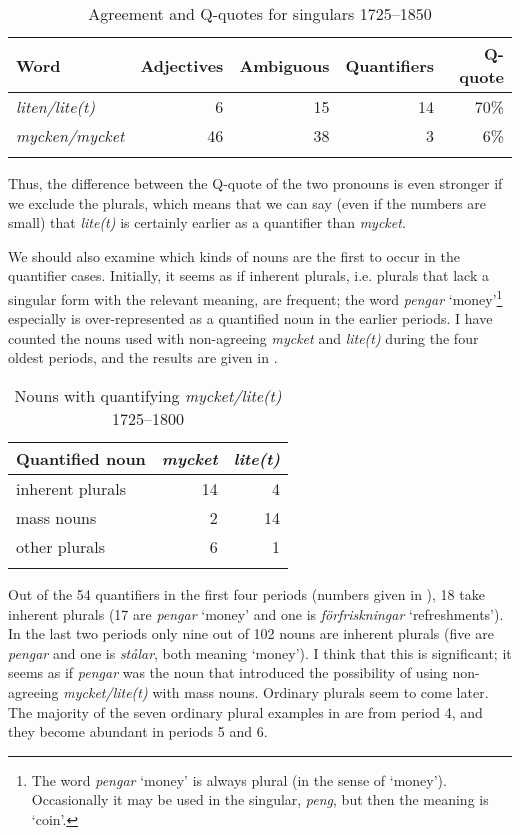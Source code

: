 \documentclass[output=paper]{langscibook}
\begin{document}
\begin{table}
\caption{Agreement and Q-quotes for singulars 1725–1850\label{tab:delsing:5}}
\begin{tabular}{lrrrr}
\lsptoprule
Word & Adjectives & Ambiguous & Quantifiers & Q-quote\\
\midrule
\textit{liten/lite(t)} & 6 & 15 & 14 & 70\%\\
\textit{mycken/mycket} & 46 & 38 & 3 & 6\%\\
\lspbottomrule
\end{tabular}
\end{table}

Thus, the difference between the Q-quote of the two pronouns is even stronger if we exclude the plurals, which means that we can say (even if the numbers are small) that \textit{lite(t)} is certainly earlier as a quantifier than \textit{mycket}.



We should also examine which kinds of nouns are the first to occur in the quantifier cases. Initially, it seems as if inherent plurals, i.e. plurals that lack a singular form with the relevant meaning, are frequent; the word \textit{pengar} ‘money’\footnote{The word \textit{pengar} ‘money’ is always plural (in the sense of ‘money’). Occasionally it may be used in the singular, \textit{peng}, but then the meaning is ‘coin’.} especially is over-represented as a quantified noun in the earlier periods. I have counted the nouns used with non-agreeing \textit{mycket} and \textit{lite(t)} during the four oldest periods, and the results are given in .



\begin{table}
\caption{Nouns with quantifying \textit{mycket/lite(t)} 1725–1800}
\label{tab:delsing:6}
\begin{tabular}{lrr}
\lsptoprule
Quantified noun & \textit{mycket} & \textit{lite(t)}\\\midrule
inherent plurals & 14 & 4\\
mass nouns & 2 & 14\\
other plurals & 6 & 1\\
\lspbottomrule
\end{tabular}
\end{table}

Out of the 54 quantifiers in the first four periods (numbers given in ), 18 take inherent plurals (17 are \textit{pengar} ‘money’ and one is \textit{förfriskningar} ‘refreshments’). In the last two periods only nine out of 102 nouns are inherent plurals (five are \textit{pengar} and one is \textit{stålar}, both meaning ‘money’). I think that this is significant; it seems as if \textit{pengar} was the noun that introduced the possibility of using non-agreeing \textit{mycket/lite(t)} with mass nouns. Ordinary plurals seem to come later. The majority of the seven ordinary plural examples in  are from period 4, and they become abundant in periods 5 and 6.
\end{document}
